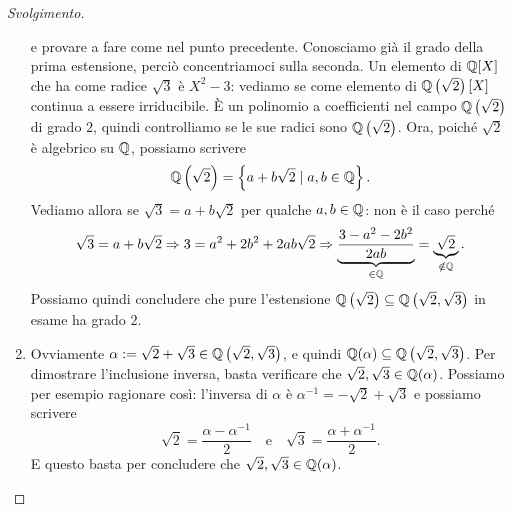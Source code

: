 \begin{proof}[Svolgimento]
\begin{enumerate}
e provare a fare come nel punto precedente. Conosciamo già il grado della prima estensione, perciò concentriamoci sulla seconda. Un elemento di $\mathbb{Q}[X]$ che ha come radice $\sqrt3$ è $X^2-3$: vediamo se come elemento di $\mathbb{Q}\left(\sqrt2\right)[X]$ continua a essere irriducibile. È un polinomio a coefficienti nel campo $\mathbb{Q}\left(\sqrt2\right)$ di grado $2$, quindi controlliamo se le sue radici sono $\mathbb{Q}\left(\sqrt2\right)$. Ora, poiché $\sqrt2$ è algebrico su $\mathbb{Q}$, possiamo scrivere
\[\mathbb{Q}\left(\sqrt2\right) = \left\{a+b\sqrt2 \mid a, b \in \mathbb{Q}\right\} .\]
Vediamo allora se $\sqrt3 = a+b\sqrt2$ per qualche $a, b \in \mathbb{Q}$: non è il caso perché
\[\sqrt3 = a+b\sqrt2 \Rightarrow 3 = a^2+2b^2+2ab\sqrt2 \Rightarrow \underbrace{\frac{3-a^2-2b^2}{2ab}}_{\in \Q} = \underbrace{\sqrt2}_{\notin \Q} .\]
Possiamo quindi concludere che pure l'estensione $\mathbb{Q}\left(\sqrt 2\right) \subseteq \mathbb{Q}\left(\sqrt 2, \sqrt 3\right)$ in esame ha grado $2$.
\item Ovviamente $\alpha := \sqrt2+\sqrt3 \in \mathbb{Q}\left(\sqrt2,\sqrt3\right)$, e quindi $\mathbb{Q}(\alpha)\subseteq\mathbb{Q}\left(\sqrt2,\sqrt3\right)$. Per dimostrare l'inclusione inversa, basta verificare che $\sqrt2,\sqrt3 \in \mathbb{Q}(\alpha)$. Possiamo per esempio ragionare così: l'inversa di $\alpha$ è $\alpha^{-1} = -\sqrt2 + \sqrt3$ e possiamo scrivere
\[\sqrt2 = \frac{\alpha - \alpha^{-1}}{2} \quad\text{e}\quad \sqrt3 = \frac{\alpha+\alpha^{-1}}{2} .\]
E questo basta per concludere che $\sqrt 2, \sqrt3 \in \mathbb{Q}(\alpha)$.

\end{enumerate}
\end{proof}
